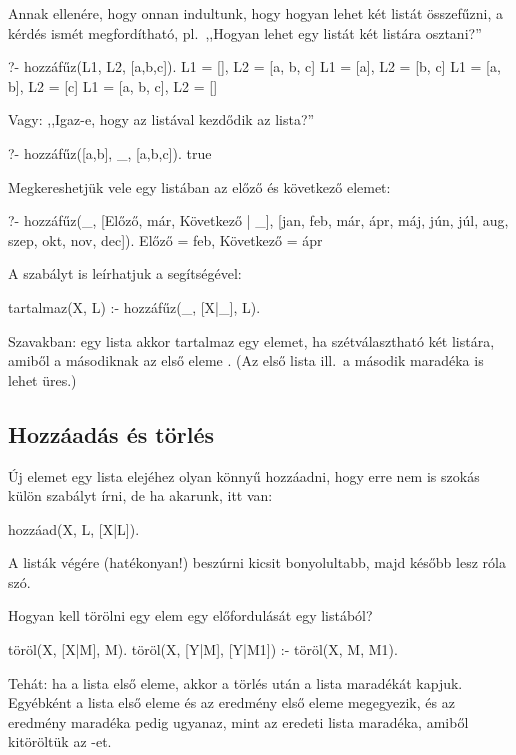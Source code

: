 Annak ellenére, hogy onnan indultunk, hogy hogyan
lehet két listát összefűzni, a kérdés ismét
megfordítható, pl.~,,Hogyan lehet egy listát két
listára osztani?''
\begin{query}
?- hozzáfűz(L1, L2, [a,b,c]).
L1 = [],
L2 = [a, b, c]
L1 = [a],
L2 = [b, c]
L1 = [a, b],
L2 = [c]
L1 = [a, b, c],
L2 = []
\end{query}

Vagy: ,,Igaz-e, hogy az \pr{[a,b]} listával kezdődik
az \pr{[a,b,c]} lista?''
\begin{query}
?- hozzáfűz([a,b], _, [a,b,c]).
true
\end{query}

Megkereshetjük vele egy listában az előző és
következő elemet:
\begin{query}
?- hozzáfűz(_, [Előző, már, Következő | _],
   [jan, feb, már, ápr, máj, jún,
    júl, aug, szep, okt, nov, dec]).
Előző = feb,
Következő = ápr
\end{query}

A  szabályt is leírhatjuk a
segítségével:
\begin{program}
tartalmaz(X, L) :- hozzáfűz(_, [X|_], L).
\end{program}
Szavakban: egy  lista akkor tartalmaz egy
 elemet, ha szétválasztható két listára,
amiből a másodiknak az első eleme . (Az első
lista ill.~a második maradéka is lehet üres.)

\subsection*{Hozzáadás és törlés}
Új elemet egy lista elejéhez olyan könnyű hozzáadni,
hogy erre nem is szokás külön szabályt írni, de ha
akarunk, itt van:
\begin{program}
hozzáad(X, L, [X|L]).
\end{program}
A listák végére (hatékonyan!) beszúrni kicsit
bonyolultabb, majd később lesz róla szó.

Hogyan kell törölni egy elem egy előfordulását egy
listából?
\begin{program}
töröl(X, [X|M], M).
töröl(X, [Y|M], [Y|M1]) :- töröl(X, M, M1).
\end{program}
Tehát: ha  a lista első eleme, akkor a törlés
után a lista maradékát kapjuk. Egyébként a lista
első eleme és az eredmény első eleme megegyezik, és
az eredmény maradéka pedig ugyanaz, mint az eredeti
lista maradéka, amiből kitöröltük az -et.

